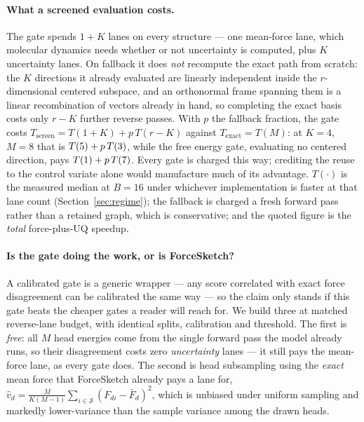\documentclass{article}
\begin{document}
\paragraph{What a screened evaluation costs.}
The gate spends $1{+}K$ lanes on every structure --- one mean-force lane, which molecular dynamics
needs whether or not uncertainty is computed, plus $K$ uncertainty lanes. On fallback it does
\emph{not} recompute the exact path from scratch: the $K$ directions it already evaluated are
linearly independent inside the $r$-dimensional centered subspace, and an orthonormal frame spanning
them is a linear recombination of vectors already in hand, so completing the exact basis costs only
$r{-}K$ further reverse passes. With $p$ the fallback fraction, the gate costs
$T_{\mathrm{screen}}=T(1{+}K)+p\,T(r{-}K)$ against $T_{\mathrm{exact}}=T(M)$: at $K{=}4$, $M{=}8$
that is $T(5)+p\,T(3)$, while the free energy gate, evaluating no centered
direction, pays $T(1)+p\,T(7)$. Every gate is charged this way; crediting the
reuse to the control variate alone would manufacture much of its advantage. $T(\cdot)$ is the
measured median at $B{=}16$ under whichever implementation is faster at that lane count
(Section~\ref{sec:regime}); the fallback is charged a fresh forward pass rather than a retained graph,
which is conservative; and the quoted figure is the \emph{total} force-plus-UQ speedup.

\paragraph{Is the gate doing the work, or is ForceSketch?}
A calibrated gate is a generic wrapper --- any score correlated with exact force disagreement can be
calibrated the same way --- so the claim only stands if this gate beats the cheaper gates a reader
will reach for. We build three at matched reverse-lane budget, with identical splits, calibration and
threshold. The first is \emph{free}: all $M$ head energies come from the single forward pass the
model already runs, so their disagreement costs zero \emph{uncertainty} lanes --- it still pays the
mean-force lane, as every gate does. The second is head subsampling
using the \emph{exact} mean force that ForceSketch already pays a lane for,
$\hat v_d=\frac{M}{K(M-1)}\sum_{i\in\mathcal S}(F_{di}-\bar F_d)^2$, which is unbiased under uniform
sampling and markedly lower-variance than the sample variance among the drawn heads.
\end{document}
